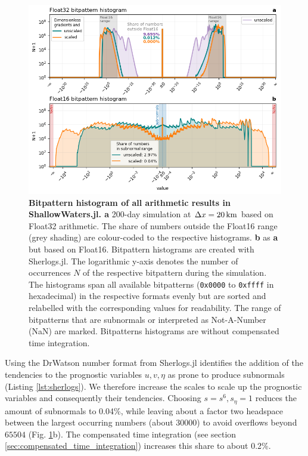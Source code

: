\begin{figure}[tbhp]
	\includegraphics[width=1\textwidth]{Figures/a64fx/bitpattern_hist.png}
	\caption{\textbf{Bitpattern histogram of all arithmetic results in ShallowWaters.jl. a}
	200-day simulation at $\Delta x = 20\operatorname{km}$ based on Float32 arithmetic. The share of numbers
	outside the Float16 range (grey shading) are colour-coded to the respective histograms. \textbf{b} as \textbf{a}
	but based on Float16. Bitpattern histograms are created with Sherlogs.jl. The logarithmic y-axis denotes the
	number of occurrences $N$ of the respective bitpattern during the simulation. The histograms span all
	available bitpatterns (\texttt{0x0000} to \texttt{0xffff} in hexadecimal) in the respective formats evenly
	but are sorted and relabelled with the corresponding values for readability. The range of bitpatterns that
	are subnormals or interpreted as Not-A-Number (NaN) are marked. Bitpatterns histograms are without
	compensated time integration.}
	\label{fig:a64fx_bitpatternhist}
\end{figure}

Using the DrWatson number format from Sherlogs.jl identifies the addition of the tendencies to the
prognostic variables $u,v,\eta$ as prone to produce subnormals (Listing \ref{lst:sherlogs}). We therefore
increase the scales  to scale up the prognostic variables and consequently their tendencies. Choosing
$s = s^6, s_\eta = 1$ reduces the amount of subnormals to 0.04\%, while leaving about a factor two
headspace between the largest occurring numbers (about $30000$) to avoid overflows beyond $65504$
(Fig. \ref{fig:a64fx_bitpatternhist}b). The compensated time integration (see section
\ref{sec:compensated_time_integration}) increases this share to about 0.2\%.

